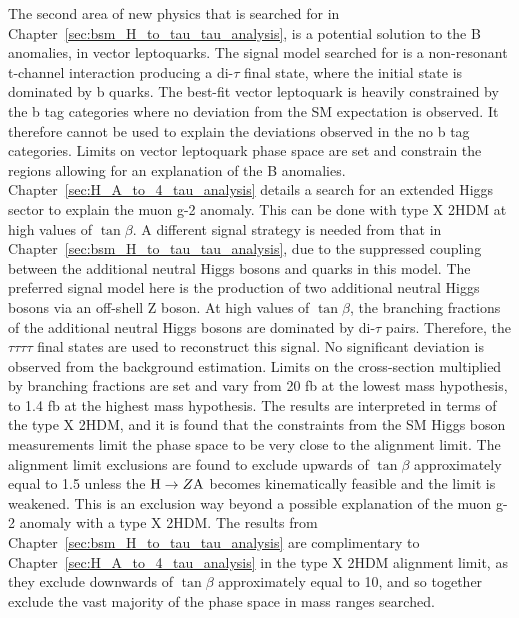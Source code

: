The second area of new physics that is searched for in Chapter~\ref{sec:bsm_H_to_tau_tau_analysis}, is a potential solution to the B anomalies, in vector leptoquarks.
The signal model searched for is a non-resonant t-channel interaction producing a di-$\tau$ final state, where the initial state is dominated by b quarks.
The best-fit vector leptoquark is heavily constrained by the b tag categories where no deviation from the \ac{SM} expectation is observed.
It therefore cannot be used to explain the deviations observed in the no b tag categories.
Limits on vector leptoquark phase space are set and constrain the regions allowing for an explanation of the B anomalies. \\

Chapter~\ref{sec:H_A_to_4_tau_analysis} details a search for an extended Higgs sector to explain the muon g-2 anomaly.
This can be done with type X \ac{2HDM} at high values of $\tan\beta$.
A different signal strategy is needed from that in Chapter~\ref{sec:bsm_H_to_tau_tau_analysis}, due to the suppressed coupling between the additional neutral Higgs bosons and quarks in this model.
The preferred signal model here is the production of two additional neutral Higgs bosons via an off-shell Z boson.
At high values of $\tan\beta$, the branching fractions of the additional neutral Higgs bosons are dominated by di-$\tau$ pairs.
Therefore, the $\tau\tau\tau\tau$ final states are used to reconstruct this signal.
No significant deviation is observed from the background estimation.
Limits on the cross-section multiplied by branching fractions are set and vary from 20 fb at the lowest mass hypothesis, to 1.4 fb at the highest mass hypothesis.
The results are interpreted in terms of the type X \ac{2HDM}, and it is found that the constraints from the \ac{SM} Higgs boson measurements limit the phase space to be very close to the alignment limit.
The alignment limit exclusions are found to exclude upwards of $\tan\beta$ approximately equal to 1.5 unless the ${\text{H}} \rightarrow Z{\text{A}}$ becomes kinematically feasible and the limit is weakened.
This is an exclusion way beyond a possible explanation of the muon g-2 anomaly with a type X \ac{2HDM}.
The results from Chapter~\ref{sec:bsm_H_to_tau_tau_analysis} are complimentary to Chapter~\ref{sec:H_A_to_4_tau_analysis} in the type X \ac{2HDM} alignment limit, as they exclude downwards of $\tan\beta$ approximately equal to 10, and so together exclude the vast majority of the phase space in mass ranges searched.

